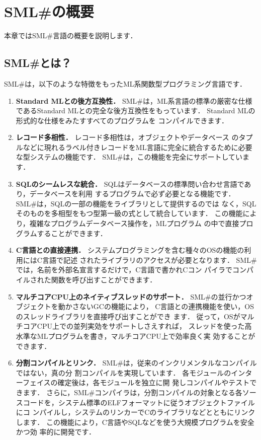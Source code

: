 \documentclass{jbook}
\newcommand{\smlsharp}{SML\#}
\begin{document}
\chapter{\smlsharp{}の概要}
\label{chap:intro}

	本章では\smlsharp{}言語の概要を説明します．

\section{\smlsharp{}とは？}
\label{sec:whatIsSmlsharp}

	\smlsharp{}は，以下のような特徴をもったML系関数型プログラミング言語です．
\begin{enumerate}
\item {\bf Standard MLとの後方互換性．}
	\smlsharp{}は，ML系言語の標準の厳密な仕様であるStandard
MLとの完全な後方互換性をもっています．
	Standard MLの形式的な仕様\cite{sml}をみたすすべてのプログラムを
コンパイルできます．

\item {\bf レコード多相性．}
	レコード多相性\cite{ohor95toplas}は，オブジェクトやデータベース
のタプルなどに現れるラベル付きレコードをML言語に完全に統合するために必要
な型システムの機能です．
	\smlsharp{}は，この機能を完全にサポートしています．

\item {\bf SQLのシームレスな統合．}
	SQLはデータベースの標準問い合わせ言語であり，データベースを利用
するプログラムで必ず必要となる機能です．
	\smlsharp{}は，SQLの一部の機能をライブラリとして提供するのでは
なく，SQLそのものを多相型をもつ型第一級の式として統合しています．
	この機能により，複雑なプログラムデータベース操作を，MLプログラム
の中で直接プログラムすることができます．
	
\item {\bf C言語との直接連携．}
	システムプログラミングを含む種々のOSの機能の利用にはC言語で記述
されたライブラリのアクセスが必要となります．
	\smlsharp{}では，名前を外部名宣言するだけで，C言語で書かれCコン
パイラでコンパイルされた関数を呼び出すことができます．

\item {\bf マルチコアCPU上のネイティブスレッドのサポート．}
	\smlsharp{}の並行かつオブジェクトを動かさないGCの機能により，
C言語との連携機能を使い，OSのスレッドライブラリを直接呼び出すことができ
ます．
	従って，OSがマルチコアCPU上での並列実効をサポートしさえすれば，
スレッドを使った高水準なMLプログラムを書き，マルチコアCPU上で効率良く実
効することができます．

\item {\bf 分割コンパイルとリンク．}
	\smlsharp{}は，従来のインクリメンタルなコンパイルではない，真の分
割コンパイルを実現しています．
	各モジュールのインターフェイスの確定後は，各モジュールを独立に開
発しコンパイルやテストできます．
	さらに，\smlsharp{}コンパイラは，分割コンパイルの対象となる各ソー
スコードを，システム標準のELFフォーマットに従うオブジェクトファイルにコ
ンパイルし，システムのリンカーでCのライブラリなどとともにリンクします．
	この機能により，C言語やSQLなどを使う大規模プログラムを安全かつ効
率的に開発です．

\end{enumerate}
	
\end{document}
